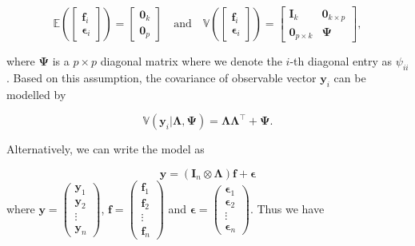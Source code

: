 \documentclass[
  a4paper,
  oneside,
  openany,
  12pt,
  onecolumn,
  twoside]{book}
\theoremstyle{plain}
\theoremstyle{remark}
\begin{document}
\[\mathbb{E}\left(\begin{bmatrix}\boldsymbol{f}_i\\\boldsymbol{\epsilon}_i\end{bmatrix}\right) = \begin{bmatrix}\boldsymbol{0}_k\\\boldsymbol{0}_p\end{bmatrix}\quad\text{and}\quad\mathbb{V}\left(\begin{bmatrix}\boldsymbol{f}_i\\\boldsymbol{\epsilon}_i\end{bmatrix}\right) =\begin{bmatrix}\mathbf{I}_k & \mathbf{0}_{k\times p}\\\mathbf{0}_{p\times k} & \mathbf{\Psi}\end{bmatrix},\]

where \(\boldsymbol{\Psi}\) is a \(p\times p\) diagonal matrix where we
denote the \(i\)-th diagonal entry as \(\psi_{ii}\). Based on this
assumption, the covariance of observable vector \(\boldsymbol{y}_i\) can
be modelled by

\[\mathbb{V}(\boldsymbol{y}_i|\boldsymbol{\Lambda},\boldsymbol{\Psi} )=\boldsymbol{\Lambda}\boldsymbol{\Lambda}^\top+\boldsymbol{\Psi}.\]

Alternatively, we can write the model as

\[\boldsymbol{y} = (\mathbf{I}_n \otimes \boldsymbol{\Lambda})\boldsymbol{f} + \boldsymbol{\epsilon}\]
where \(\boldsymbol{y} =
\begin{pmatrix}
\boldsymbol{y}_1 \\ \boldsymbol{y}_2 \\ \vdots \\ \boldsymbol{y}_n
\end{pmatrix}\), \(\boldsymbol{f} =
\begin{pmatrix}
\boldsymbol{f}_1 \\ \boldsymbol{f}_2 \\ \vdots \\  \boldsymbol{f}_n
\end{pmatrix}\) and \(\boldsymbol{\epsilon} =
\begin{pmatrix}
\boldsymbol{\epsilon}_1 \\ \boldsymbol{\epsilon}_2 \\ \vdots \\  \boldsymbol{\epsilon}_n
\end{pmatrix}\). Thus we have
\end{document}
